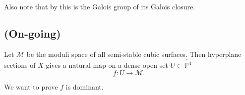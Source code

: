 \documentclass{article}
\begin{document}
Also note that by \cite[Sec.1]{Ha} this is the Galois group of its Galois closure. 

\subsection{(On-going)}
Let $\mathcal M$ be the moduli space of all semi-stable cubic surfaces. Then hyperplane sections of $X$ gives a natural map on a dense open set $U\subset \check{\mathbb P^4}$
$$f\colon U\to \mathcal M \text{.}$$

We want to prove $f$ is dominant. 






\end{document}
